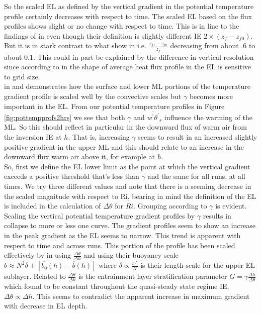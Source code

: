 So the scaled \acs{EL} as defined by the vertical gradient in the potential temperature profile certainly decreases with respect to time.  The scaled \acs{EL} based on the flux profiles shows slight or no change with respect to time.  This is in line to the findings of \citeauthor{BrooksFowler2} in \cite{BrooksFowler2} even though their definition is slightly different IE $2 \times (z_{f}-z_{f0})$.  But it is in stark contrast to what \citeauthor{FedConzMir04} show in \cite{FedConzMir04} i.e. $\frac{z_{f1}-z_{f0}}{z_{f}}$ decreasing from about .6 to about 0.1.  This could in part be explained by the difference in vertical resolution since according to \citeauthor{SullPat} in \cite{SullPat} the shape of average heat flux profile in the \acs{EL} is sensitive to grid size.\\

\citeauthor{Sorbjan} in \cite{Sorbjan} and \cite{Sorbjan1} demonstrates how the surface and lower \acs{ML} portions of the temperature gradient profile is scaled well by the convective scales but $\gamma$ becomes more important in the \acs{EL}.  From our potential temperature profiles in Figure \ref{fig:pottempprofs2hrs} we see that both $\gamma$ and $\overline{w^{'}\theta^{'}}_{s}$ influence the warming of the \acs{ML}. So this should reflect in particular in the downward flux of warm air from the inversion IE at $h$. That is, increasing $\gamma$ seems to result in an increased slightly positive gradient in the upper \acs{ML} and this should relate to an increase in the downward flux warm air above it, for example at $h$.\\

So, first we define the \acs{EL} lower limit as the point at which the vertical gradient exceeds a positive threshold that's less than $\gamma$ and the same for all runs, at all times. We try three different values and note that there is a seeming decrease in the scaled magnitude with respect to \acs{Ri}, bearing in mind the definition of the \acs{EL} is included in the calculation of $\Delta \theta$ for $Ri$. Grouping according to $\gamma$ is evident.\\

Scaling the vertical potential temperature gradient profiles by $\gamma$ results in collapse to more or less one curve.  The gradient profiles seem to show an increase in the peak gradient as the \acs{EL} seems to narrow. This trend is apparent with respect to time and across runs.  This portion of the profile has been scaled effectively by \citeauthor{Sorbjan1} in \cite{Sorbjan1} using $\frac{\Delta \theta}{\Delta h}$ and \citeauthor{GarciaMellado} using their buoyancy scale $b \approx N^{2} \delta + [\overline{b_{0}}(h) - \overline{b}(h)]$ where $\delta \propto \frac{w^{*}}{N}$ is their length-scale for the upper \acs{EL} sublayer.  Related to $\frac{\Delta \theta}{\Delta h}$ is the entrainment layer stratification parameter $G = \gamma \frac{\Delta h}{\Delta \theta}$ which \citeauthor{FedConzMir04} found to be constant throughout the quasi-steady state regime IE, $\Delta \theta \propto \Delta h$.  This seems to contradict the apparent increase in maximum gradient with decrease in \acs{EL} depth.

